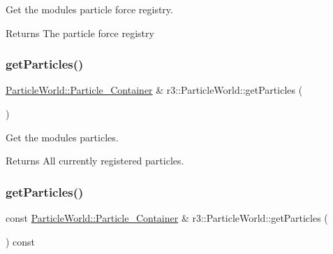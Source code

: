 Get the module\textquotesingle{}s particle force registry. 

\begin{DoxyReturn}{Returns}
The particle force registry 
\end{DoxyReturn}
\mbox{\label{classr3_1_1_particle_world_a00a5014002f28e35ebb59a3f8175db3c}} 
\subsubsection{\texorpdfstring{get\+Particles()}{getParticles()}\hspace{0.1cm}{\footnotesize\ttfamily [1/2]}}
{\footnotesize\ttfamily \mbox{\hyperlink{classr3_1_1_particle_world_aa354f6786c0837674fe8286f00465631}{Particle\+World\+::\+Particle\+\_\+\+Container}} \& r3\+::\+Particle\+World\+::get\+Particles (\begin{DoxyParamCaption}{ }\end{DoxyParamCaption})}



Get the module\textquotesingle{}s particles. 

\begin{DoxyReturn}{Returns}
All currently registered particles. 
\end{DoxyReturn}
\mbox{\label{classr3_1_1_particle_world_ab816d6bca8b42fdf16170275087008f0}} 
\subsubsection{\texorpdfstring{get\+Particles()}{getParticles()}\hspace{0.1cm}{\footnotesize\ttfamily [2/2]}}
{\footnotesize\ttfamily const \mbox{\hyperlink{classr3_1_1_particle_world_aa354f6786c0837674fe8286f00465631}{Particle\+World\+::\+Particle\+\_\+\+Container}} \& r3\+::\+Particle\+World\+::get\+Particles (\begin{DoxyParamCaption}{ }\end{DoxyParamCaption}) const}




